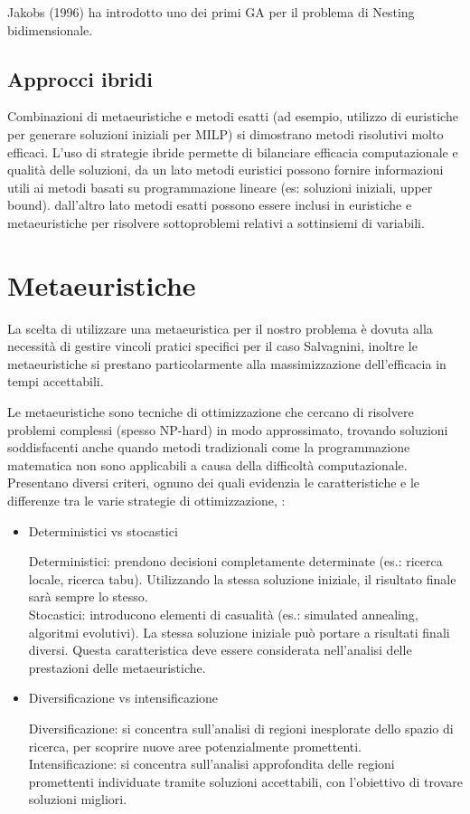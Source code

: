 Jakobs (1996) ha introdotto uno dei primi GA per il problema di Nesting bidimensionale.

\subsection{Approcci ibridi}

Combinazioni di metaeuristiche e metodi esatti (ad esempio, utilizzo di euristiche per generare soluzioni iniziali per MILP) si dimostrano metodi risolutivi molto efficaci. L'uso di strategie ibride permette di bilanciare efficacia computazionale e qualità delle soluzioni, da un lato metodi euristici possono fornire informazioni utili ai metodi basati su programmazione lineare (es: soluzioni iniziali, upper bound). dall'altro lato metodi esatti possono essere inclusi in euristiche e metaeuristiche per risolvere sottoproblemi relativi a sottinsiemi di variabili. 

\section{Metaeuristiche}

La scelta di utilizzare una metaeuristica per il nostro problema è dovuta alla necessità di gestire vincoli pratici specifici per il caso Salvagnini, inoltre le metaeuristiche si prestano particolarmente alla massimizzazione dell'efficacia in tempi accettabili.

Le metaeuristiche sono tecniche di ottimizzazione che cercano di risolvere problemi complessi (spesso NP-hard) in modo approssimato, trovando soluzioni soddisfacenti anche quando metodi tradizionali come la programmazione matematica non sono applicabili a causa della difficoltà computazionale. Presentano diversi criteri, ognuno dei quali evidenzia le caratteristiche e le differenze tra le varie strategie di ottimizzazione, :
\begin{itemize}
    \item Deterministici vs stocastici

    Deterministici: prendono decisioni completamente determinate (es.: ricerca locale, ricerca tabu). Utilizzando la stessa soluzione iniziale, il risultato finale sarà sempre lo stesso. \\
    Stocastici: introducono elementi di casualità (es.: simulated annealing, algoritmi evolutivi). La stessa soluzione iniziale può portare a risultati finali diversi. Questa caratteristica deve essere considerata nell'analisi delle prestazioni delle metaeuristiche.
    \item Diversificazione vs intensificazione
    
    Diversificazione: si concentra sull'analisi di regioni inesplorate dello spazio di ricerca, per scoprire nuove aree potenzialmente promettenti.\\
    Intensificazione: si concentra sull'analisi approfondita delle regioni promettenti individuate tramite soluzioni accettabili, con l'obiettivo di trovare soluzioni migliori.
\end{itemize}


